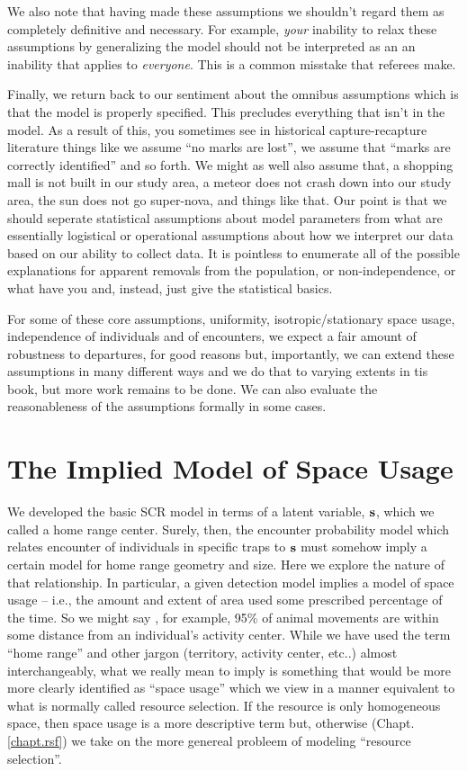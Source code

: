We also note that having made these assumptions we shouldn't regard
them as completely definitive and necessary. For example, {\it your} inability to relax these
assumptions by generalizing the model should not be interpreted as
an an inability that applies to {\it everyone}. This is a common
misstake that referees make.

Finally, we return back to our sentiment about the omnibus assumptions
which is that the model is properly specified. This precludes
everything that isn't in the model. As a result of this,  you
sometimes see in historical capture-recapture literature things like 
we assume ``no marks are lost'', we assume that ``marks are correctly
identified'' and so forth. We might as well also assume that, a
shopping mall is not built in our study area, a meteor
does not crash down into our study area,  
the sun does not go super-nova, and things like that. Our point is
that we should seperate statistical assumptions about model parameters
from what are essentially logistical or operational assumptions about
how we interpret our data based on our ability to collect data. It is
pointless to enumerate all of the possible explanations for apparent
removals from the population, or non-independence, or what have you
and, instead, just give the statistical basics. 

For some of these core assumptions, uniformity, isotropic/stationary space usage, independence
of individuals and of encounters, we expect a fair amount of 
robustness to departures,  for good reasons but, importantly, we can extend
these assumptions in many different ways and we do that to varying
extents in tis book, but more work remains to be done. We can also
evaluate the reasonableness of the assumptions formally in some cases.

\section{The Implied Model of Space Usage}
\label{sec.scr0.implied}

We developed the basic SCR model in terms of a latent variable, ${\bf
  s}$, which we called a home range center.  Surely, then, the
encounter probability model which relates encounter of individuals in
specific traps to ${\bf s}$ must somehow imply a certain model for
home range geometry and size.  Here we explore the nature of that
relationship. In particular, 
a given detection model implies a model 
of space usage -- i.e., the amount and extent of area used some prescribed
percentage of the time. So we might say , for example, 95\% of animal movements are within
some distance from an individual's activity center. 
 While we have used the term ``home range'' and other
jargon (territory, activity center, etc..) almost interchangeably,
what we really mean to imply is something that would be more more
clearly identified as ``space usage'' which we view in a manner
equivalent to what is normally called resource selection. If the
resource is only homogeneous space, then space usage is a more
descriptive term but, otherwise (Chapt. \ref{chapt.rsf}) we take on
the more genereal probleem of modeling
 ``resource selection''.


